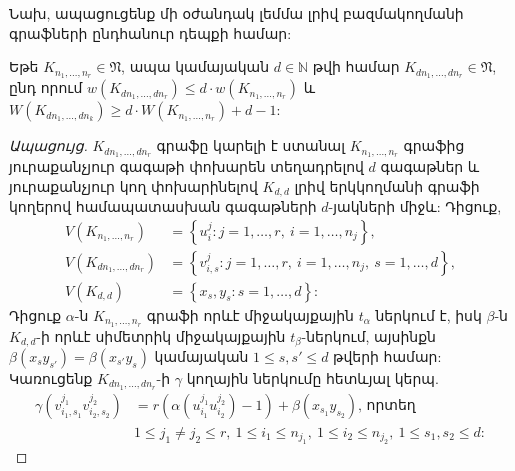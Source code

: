 Նախ, ապացուցենք մի օժանդակ լեմմա լրիվ բազմակողմանի գրաֆների ընդհանուր դեպքի համար:
\begin{lemma}
\label{l1-k-partite-scale}
Եթե $K_{n_1,\dots,n_r} \in \mathfrak{N}$, ապա կամայական $d \in \mathbb{N}$ թվի համար $K_{dn_1, \ldots, dn_r} \in \mathfrak{N}$, ընդ որում $w(K_{dn_1, \ldots, dn_r}) \leq d \cdot w(K_{n_1, \ldots, n_r})$ և $W(K_{dn_1, \ldots, dn_k}) \geq d \cdot W(K_{n_1, \ldots, n_r}) + d - 1$:
\end{lemma}
\begin{proof}[Ապացույց]
$K_{dn_1, \ldots, dn_r}$ գրաֆը կարելի է ստանալ $K_{n_1, \ldots, n_r}$ գրաֆից յուրաքանչյուր գագաթի փոխարեն տեղադրելով $d$ գագաթներ և յուրաքանչյուր կող փոխարինելով $K_{d,d}$ լրիվ երկկողմանի գրաֆի կողերով համապատասխան գագաթների $d$-յակների միջև: Դիցուք,
\begin{align*}
    V(K_{n_1, \ldots, n_r}) &= \left\{u_i^j : j=1,\ldots,r,\ i=1,\ldots,n_j \right\}, \\
    V(K_{dn_1, \ldots, dn_r}) &= \left\{v_{i,s}^j : j=1,\ldots,r,\ i=1,\ldots,n_j,\ s=1,\ldots,d \right\}, \\
    V(K_{d,d}) &= \left\{x_s,y_s : s=1,\ldots,d\right\}:
\end{align*}
Դիցուք $\alpha$-ն $K_{n_1, \ldots, n_r}$ գրաֆի որևէ միջակայքային $t_{\alpha}$ ներկում է, իսկ $\beta$-ն $K_{d,d}$-ի որևէ սիմետրիկ միջակայքային $t_{\beta}$-ներկում, այսինքն $\beta(x_sy_{s'})=\beta(x_{s'}y_{s})$ կամայական $1 \leq s, s' \leq d$ թվերի համար: Կառուցենք $K_{dn_1, \ldots, dn_r}$-ի $\gamma$ կողային ներկումը հետևյալ կերպ.
\begin{align}
    \gamma(v_{i_1,s_1}^{j_1}v_{i_2,s_2}^{j_2}) &= r(\alpha(u_{i_1}^{j_1}u_{i_2}^{j_2})-1) + \beta(x_{s_1}y_{s_2}) \text{, որտեղ }\\
    &1 \leq j_1 \ne j_2 \leq r,\ 1\leq i_1 \leq n_{j_1},\ 1 \leq i_2 \leq n_{j_2},\ 1\leq s_1, s_2 \leq d:
\end{align}


\end{proof}
